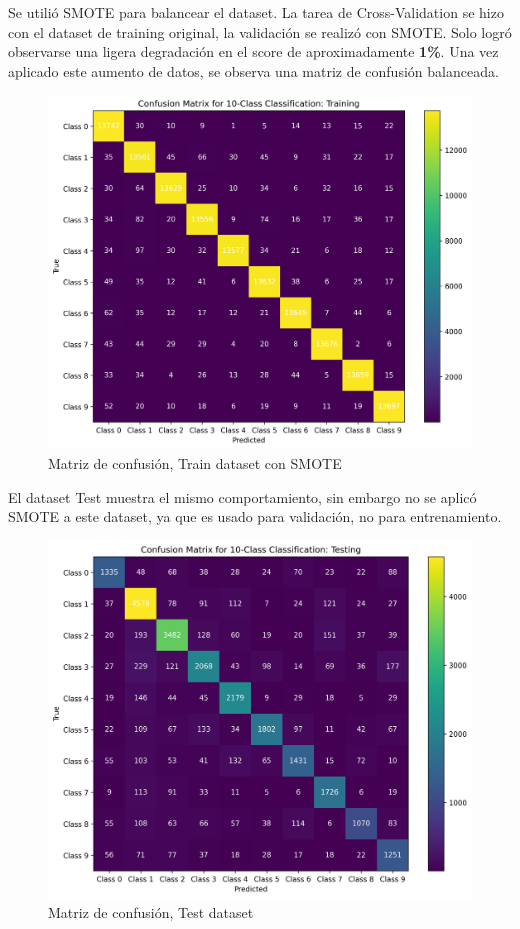 \documentclass[journal]{IEEEtran}
\begin{document}
Se utilió SMOTE\cite{smote2023} para balancear el dataset. La tarea de Cross-Validation se hizo con el dataset de training original, la validación se realizó con SMOTE. Solo logró observarse una ligera degradación en el score de aproximadamente \textbf{1\%}. Una vez aplicado este aumento de datos, se observa una matriz de confusión balanceada.

\begin{figure}[H]
        \centering
        \includegraphics[width=\linewidth]{figures/confusion_matrix_Training_postSMOTE.png}
        \caption{Matriz de confusión, Train dataset con SMOTE}
        \label{fig:confusion_matrix_post_smote}
\end{figure}

El dataset Test muestra el mismo comportamiento, sin embargo no se aplicó SMOTE a este dataset, ya que es usado para validación, no para entrenamiento.

\begin{figure}[H]
        \centering
        \includegraphics[width=\linewidth]{figures/confusion_matrix_Testing_preSMOTE.png}
        \caption{Matriz de confusión, Test dataset}
        \label{fig:confusion_matrix_test}
\end{figure}
\end{document}

